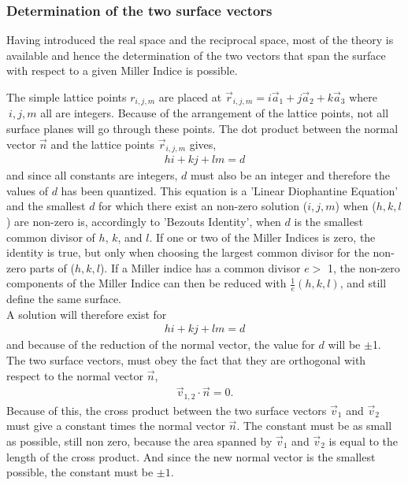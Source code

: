 \documentclass[11pt]{article} %
\begin{document}
\subsubsection{Determination of the two surface vectors}
Having introduced the real space and the reciprocal space, most of the theory is available and hence the determination of the two vectors that span the surface with respect to a given Miller Indice is possible. 

The simple lattice points $r_{i,j,m}$ are placed at $\vec{r}_{i,j,m} = i\vec{a}_1+j\vec{a}_2+k\vec{a}_3$ where $\ i,j,m$ all are integers. Because of the arrangement of the lattice points, not all surface planes will go through these points. The dot product between the normal vector $\vec{n}$ and the lattice points $\vec{r}_{i,j,m}$ gives, 
\begin{eqnarray}
hi+kj+lm = d \nonumber
\end{eqnarray}
and since all constants are integers, $d$ must also be an integer and therefore the values of $d$ has been quantized. This equation is a 'Linear Diophantine Equation' and the smallest $d$ for which there exist an non-zero solution ($i,j,m$) when ($h,k,l$) are non-zero is, accordingly to 'Bezouts Identity', when $d$ is the smallest common divisor of $h$, $k$, and $l$. If one or two of the Miller Indices is zero, the identity is true, but only when choosing the largest common divisor for the non-zero parts of ($h,k,l$). If a Miller indice has a common divisor $e >$ 1, the non-zero components of the Miller Indice can then be reduced with $\frac{1}{e}(h,k,l)$, and still define the same surface. \\
A solution will therefore exist for 
\begin{eqnarray}
hi+kj+lm = d 
\end{eqnarray}
and because of the reduction of the normal vector, the value for $d$ will be $\pm$1. The two surface vectors, must obey the fact that they are orthogonal with respect to the normal vector $\vec{n}$,
\begin{eqnarray}
\vec{v}_{1,2} \cdot \vec{n} = 0. \label{skalarnul}
\end{eqnarray}
Because of this, the cross product between the two surface vectors $\vec{v}_1$ and $\vec{v}_2$ must give a constant times the normal vector $\vec{n}$. The constant must be as small as possible, still non zero, because the area spanned by $\vec{v}_1$ and $\vec{v}_2$ is equal to the length of the cross product. And since the new normal vector is the smallest possible, the constant must be $\pm 1$. \\
\end{document}
